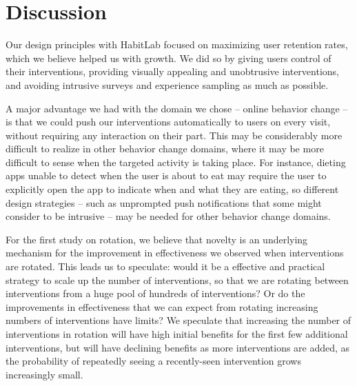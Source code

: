 \chapter{Discussion}



Our design principles with HabitLab focused on maximizing user retention rates, which we believe helped us with growth. We did so by giving users control of their interventions, providing visually appealing and unobtrusive interventions, and avoiding intrusive surveys and experience sampling as much as possible.

A major advantage we had with the domain we chose -- online behavior change -- is that we could push our interventions automatically to users on every visit, without requiring any interaction on their part. This may be considerably more difficult to realize in other behavior change domains, where it may be more difficult to sense when the targeted activity is taking place. For instance, dieting apps unable to detect when the user is about to eat may require the user to explicitly open the app to indicate when and what they are eating, so different design strategies -- such as unprompted push notifications that some might consider to be intrusive -- may be needed for other behavior change domains.

For the first study on rotation, we believe that novelty is an underlying mechanism for the improvement in effectiveness we observed when interventions are rotated. This leads us to speculate: would it be a effective and practical strategy to scale up the number of interventions, so that we are rotating between interventions from a huge pool of hundreds of interventions? Or do the improvements in effectiveness that we can expect from rotating increasing numbers of interventions have limits? We speculate that increasing the number of interventions in rotation will have high initial benefits for the first few additional interventions, but will have declining benefits as more interventions are added, as the probability of repeatedly seeing a recently-seen intervention grows increasingly small.

